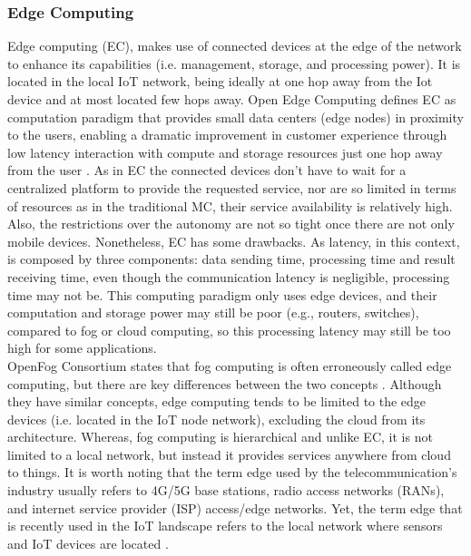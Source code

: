 \subsubsection{Edge Computing}
Edge computing (EC), makes use of connected devices at the edge of the network to enhance its capabilities (i.e. management, storage, and processing power). It is located in the local IoT network, being ideally at one hop away from the Iot device and at most located few hops away. Open Edge Computing defines EC as computation paradigm that provides small data centers (edge nodes) in proximity to the users, enabling a dramatic improvement in customer experience through low latency interaction with compute and storage resources just one hop away from the user \cite{OpenEdge73:online}. As in EC the connected devices don't have to wait for a centralized platform to provide the requested service, nor are so limited in terms of resources as in the traditional MC, their service availability is relatively high. Also, the restrictions over the autonomy are not so tight once there are not only mobile devices. Nonetheless, EC has some drawbacks. As latency, in this context, is composed by three components: data sending time, processing time and result receiving time, even though the communication latency is negligible, processing time may not be. This computing paradigm only uses edge devices, and their computation and storage power may still be poor (e.g., routers, switches), compared to fog or cloud computing, so this processing latency may still be too high for some applications.\\
\noindent\tab OpenFog Consortium states that fog computing is often erroneously called edge computing, but there are key differences between the two concepts \cite{OpenFog0208}. Although they have similar concepts, edge computing tends to be limited to the edge devices (i.e. located in the IoT node network), excluding the cloud from its architecture. Whereas, fog computing is hierarchical and unlike EC, it is not limited to a local network, but instead it provides services anywhere from cloud to things. It is worth noting that the term edge used by the telecommunication's industry usually refers to 4G/5G base stations, radio access networks (RANs), and internet service provider (ISP) access/edge networks. Yet, the term edge that is recently used in the IoT landscape refers to the local network where sensors and IoT devices are located \cite{yousefpour2018all}.


